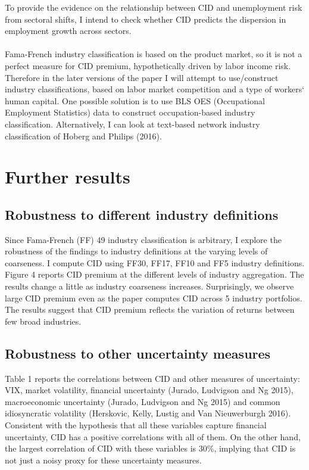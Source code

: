 \documentclass[12pt]{article}
\begin{document}
To provide the evidence on the relationship between CID and unemployment risk from sectoral shifts, I intend to check whether CID predicts the dispersion in employment growth across sectors.
\paragraph{}
Fama-French industry classification is based on the product market, so it is not a perfect measure for CID premium, hypothetically driven by labor income risk. Therefore in the later versions of the paper I will attempt to use/construct industry classifications, based on labor market competition and a type of workers` human capital. One possible solution is to use BLS OES (Occupational Employment Statistics) data to construct occupation-based industry classification. Alternatively, I can look at text-based network industry classification of Hoberg and Philips (2016).


\section{Further results} \label{sec:Model}
\subsection{Robustness to different industry definitions}

Since Fama-French (FF) 49 industry classification is arbitrary, I explore the robustness of the findings to industry definitions at the varying levels of coarseness. I compute CID using FF30, FF17, FF10 and FF5 industry definitions. Figure 4 reports CID premium at the different levels of industry aggregation. The results change a little as industry coarseness increases. Surprisingly, we observe large CID premium even as the paper computes CID across 5 industry portfolios. The results suggest that CID premium reflects the variation of returns between few broad industries.  

\subsection{Robustness to other uncertainty measures}

Table 1 reports the correlations between CID and other measures of uncertainty: VIX, market volatility, financial uncertainty (Jurado, Ludvigson and Ng 2015), macroeconomic uncertainty (Jurado, Ludvigson and Ng 2015) and common idiosyncratic volatility (Herskovic, Kelly, Lustig and Van Nieuwerburgh 2016). Consistent with the hypothesis that all these variables capture financial uncertainty, CID has a positive correlations with all of them. On the other hand, the largest correlation of CID with these variables is 30\%, implying that CID is not just a noisy proxy for these uncertainty measures.
\end{document}
